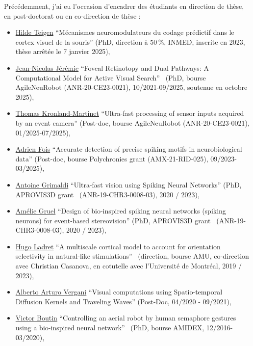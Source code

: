 \documentclass[10pt,french,a4paper,oneside]{article}%
\begin{document}
Précédemment, j'ai eu l'occasion d'encadrer des étudiants en direction de thèse, en post-doctorat ou en co-direction de thèse :
\begin{itemize}
	\item \href{https://laurentperrinet.github.io/author/hilde-langengen-teigen/}{Hilde Teigen} ``Mécanismes neuromodulateurs du codage prédictif dans le cortex visuel de la souris'' (PhD, direction à 50\,\%, INMED, inscrite en 2023, thèse arrêtée le 7 janvier 2025),
	\item \href{https://laurentperrinet.github.io/author/jean-nicolas-jeremie/}{Jean-Nicolas Jérémie} ``Foveal Retinotopy and Dual Pathways: A Computational Model for Active Visual Search''~\textcite{Jeremie25thesis} (PhD, bourse AgileNeuRobot (ANR-20-CE23-0021), 10/2021-09/2025, soutenue en octobre 2025),
	\item \href{https://laurentperrinet.github.io/author/thomas-kronland-martinet/}{Thomas Kronland-Martinet} ``Ultra-fast processing of sensor inputs acquired by an event camera'' (Post-doc, bourse AgileNeuRobot (ANR-20-CE23-0021), 01/2025-07/2025),
	\item \href{https://laurentperrinet.github.io/author/adrien-fois/}{Adrien Fois} ``Accurate detection of precise spiking motifs in neurobiological data'' (Post-doc, bourse Polychronies grant (AMX-21-RID-025), 09/2023-03/2025),
	\item \href{https://laurentperrinet.github.io/author/antoine-grimaldi/}{Antoine Grimaldi} ``Ultra-fast vision using Spiking Neural Networks'' (PhD, APROVIS3D grant~\textcite{Grimaldi24thesis} (ANR-19-CHR3-0008-03), 2020 / 2023),
	\item \href{https://laurentperrinet.github.io/author/amélie-gruel/}{Amélie Gruel} ``Design of bio-inspired spiking neural networks (spiking neurons) for event-based stereovision'' (PhD, APROVIS3D grant~\textcite{Gruel23thesis} (ANR-19-CHR3-0008-03), 2020 / 2023),
	\item \href{https://laurentperrinet.github.io/author/hugo-ladret/}{Hugo Ladret} ``A multiscale cortical model to account for orientation selectivity in natural-like stimulations''~\textcite{Ladret24thesis}  (direction, bourse AMU, co-direction avec Christian Casanova, en cotutelle avec l'Université de Montréal, 2019 / 2023),
	\item \href{https://laurentperrinet.github.io/author/alberto-arturo-vergani/}{Alberto Arturo Vergani} 	``Visual computations using Spatio-temporal Diffusion Kernels and Traveling Waves'' (Post-Doc, 04/2020 - 09/2021),
	\item \href{https://laurentperrinet.github.io/author/victor-boutin/}{Victor Boutin} 	``Controlling an aerial robot by human semaphore gestures using a bio-inspired neural network''~\textcite{Boutin20thesis} (PhD, bourse AMIDEX, 12/2016-03/2020),

\end{itemize}
\end{document}
